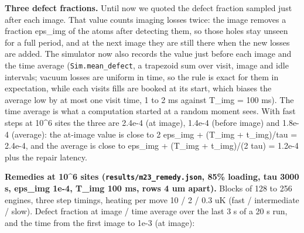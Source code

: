 \textbf{Three defect fractions.} Until now we quoted the defect fraction
sampled just after each image. That value counts imaging losses twice:
the image removes a fraction eps\_img of the atoms after detecting them,
so those holes stay unseen for a full period, and at the next image they
are still there when the new losses are added. The simulator now also
records the value just before each image and the time average
(\texttt{Sim.mean\_defect}, a trapezoid sum over visit, image and idle
intervals; vacuum losses are uniform in time, so the rule is exact for
them in expectation, while each visit\textquotesingle s fills are booked
at its start, which biases the average low by at most one visit time, 1
to 2 ms against T\_img = 100 ms). The time average is what a computation
started at a random moment sees. With fast steps at 10\^{}6 sites the
three are 2.4e-4 (at image), 1.4e-4 (before image) and 1.8e-4 (average):
the at-image value is close to 2 eps\_img + (T\_img + t\_img)/tau =
2.4e-4, and the average is close to eps\_img + (T\_img + t\_img)/(2 tau)
= 1.2e-4 plus the repair latency.

\textbf{Remedies at 10\^{}6 sites (\texttt{results/m23\_remedy.json},
85\% loading, tau 3000 s, eps\_img 1e-4, T\_img 100 ms, rows 4 um
apart).} Blocks of 128 to 256 engines, three step timings, heating per
move 10 / 2 / 0.3 uK (fast / intermediate / slow). Defect fraction at
image / time average over the last 3 s of a 20 s run, and the time from
the first image to 1e-3 (at image):

